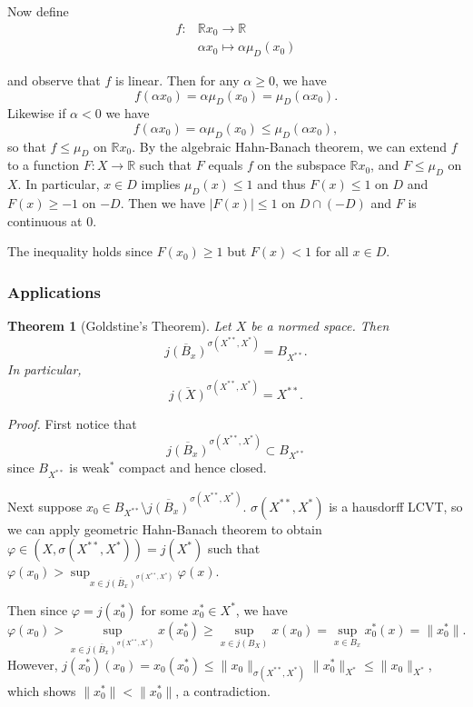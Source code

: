 \documentclass[11pt, reqno]{article}
\theoremstyle{plain}
\newtheorem*{theorem}{Theorem}
\theoremstyle{definition}
\theoremstyle{remark}
\renewcommand{\phi}{\varphi}
\newcommand{\RR}{\mathbb{R}}
\begin{document}
Now define 
\begin{align*}
    f: & \RR x_0 \rightarrow \RR\\
    &\alpha x_0 \mapsto \alpha \mu_D(x_0)
\end{align*}

and observe that $f$ is linear. Then for any $\alpha \geq 0$, we have 
\[
    f(\alpha x_0) = \alpha \mu_D(x_0) = \mu_D(\alpha x_0).
\]
Likewise if $\alpha < 0$ we have 
\[
    f(\alpha x_0) = \alpha \mu_D(x_0) \leq \mu_D(\alpha x_0),
\]
so that $f \leq \mu_D$ on $\RR x_0$. By the algebraic Hahn-Banach theorem, we can extend $f$ to a function 
$F: X \rightarrow \RR$ such that $F$ equals $f$ on the subspace $\RR x_0$, and $F \leq \mu_D$ on $X$. 
In particular, $x \in D$ implies $\mu_D(x) \leq 1$ and thus $F(x) \leq 1$ on $D$ and $F(x) \geq -1$ on $-D$.
Then we have $|F(x)| \leq 1$ on $D \cap (-D)$ and $F$ is continuous at $0$. 

The inequality holds since $F(x_0) \geq 1$ but $F(x) < 1$ for all $x \in D$. 

\subsubsection*{Applications}

\begin{theorem}[Goldstine's Theorem]
    Let $X$ be a normed space. Then 
    \[
        \overline{j(B_x)}^{\sigma(X^{**}, X^*)} = B_{X^{**}}.
    \]
    In particular, 
    \[
        \overline{j(X)}^{\sigma(X^{**}, X^*)} = X^{**}.
    \]
\end{theorem}

\textit{Proof.} First notice that 
\[
    \overline{j(B_x)}^{\sigma(X^{**}, X^*)} \subset B_{X^{**}}
\]  
since $B_{X^{**}}$ is weak$^*$ compact and hence closed. 

Next suppose $x_0 \in B_{X^{**}} \setminus \overline{j(B_x)}^{\sigma(X^{**}, X^*)}$. $\sigma(X^{**}, X^*)$ is a 
hausdorff LCVT, so we can apply geometric Hahn-Banach theorem to obtain $\phi \in (X, \sigma(X^{**}, X^*)) = j(X^*)$
such that $\phi(x_0) > \sup_{x \in \overline{j(B_x)}^{\sigma(X^{**}, X^*)}} \phi(x)$. 

Then since $\phi = j(x_0^*)$ for some $x_0^* \in X^*$, we have 
\[
\phi(x_0) > \sup_{x \in \overline{j(B_x)}^{\sigma(X^{**}, X^*)}} x(x_0^*) \geq \sup_{x \in j(B_X)} x(x_0) =
\sup_{x \in B_x} x_0^*(x) = \|x_0^*\|.
\]
However, $j(x_0^*)(x_0) = x_0(x_0^*) \leq \|x_0\|_{\sigma(X^{**}, X^*)} \|x_0^*\|_{X^*} \leq \|x_0\|_{X^*}$,
which shows $\|x_0^*\| < \|x_0^*\|$, a contradiction.
\end{document}
